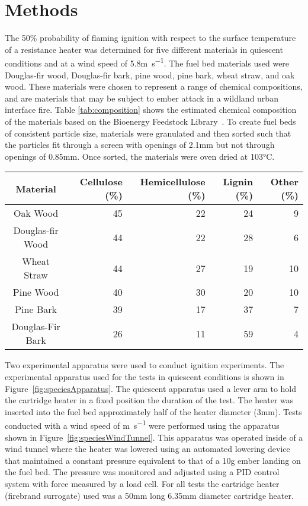 \section{Methods}
\label{sec:methods3}
    The 50\% probability of flaming ignition with respect to the surface temperature of a resistance heater was determined for five different materials in quiescent conditions and at a wind speed of 5.8\si{\meter\per\second}. The fuel bed materials used were Douglas-fir wood, Douglas-fir bark, pine wood, pine bark, wheat straw, and oak wood. These materials were chosen to represent a range of chemical compositions, and are materials that may be subject to ember attack in a wildland urban interface fire. Table \ref{tab:composition} shows the estimated chemical composition of the materials based on the Bioenergy Feedstock Library~\cite{feedstock}. To create fuel beds of consistent particle size,  materials were granulated and then sorted such that the particles fit through a screen with openings of 2.1\si{\milli\meter} but not through openings of 0.85\si{\milli\meter}. Once sorted, the materials were oven dried at 103\si{\celsius}.
    \begin{table*}[hpbt]
        \caption{Proportion of cellulose, hemicellulose, and lignin of the materials tested estimated from the Bioenergy Feedstock Library~\cite{feedstock}}
        \centering
        \begin{tabular}{crrrr}
            Material & Cellulose (\%) & Hemicellulose (\%) & Lignin (\%) & Other (\%) \\
            \hline
            Oak Wood         & 45 & 22 & 24 & 9\\
            Douglas-fir Wood & 44 & 22 & 28 & 6\\
            Wheat Straw      & 44 & 27 & 19 & 10\\
            Pine Wood        & 40 & 30 & 20 & 10\\
            Pine Bark        & 39 & 17 & 37 & 7\\
            Douglas-Fir Bark & 26 & 11 & 59 & 4 
        \end{tabular}
        \label{tab:composition}
    \end{table*}
    Two experimental apparatus were used to conduct ignition experiments. The experimental apparatus used for the tests in quiescent conditions is shown in Figure~\ref{fig:speciesApparatus}. The quiescent apparatus used a lever arm to hold the cartridge heater in a fixed position the duration of the test. The heater was inserted into the fuel bed approximately half of the heater diameter (3\si{\milli\meter}). Tests conducted with a wind speed of \si{\meter\per\second} were performed using the apparatus shown in Figure~\ref{fig:speciesWindTunnel}. This apparatus was operated inside of a wind tunnel where the heater was lowered using an automated lowering device that maintained a constant pressure equivalent to that of a 10\si{\gram} ember landing on the fuel bed. The pressure was monitored and adjusted using a PID control system with force measured by a load cell. For all tests the cartridge heater (firebrand surrogate) used was a 50\si{\milli\meter} long 6.35\si{\milli\meter} diameter cartridge heater.
